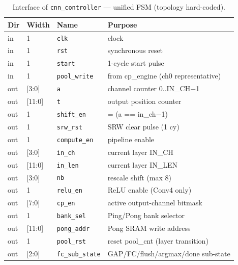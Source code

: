 
\begin{table}[t]
\centering
\caption{Interface of \texttt{cnn\_controller} — unified FSM (topology hard-coded).}
\label{tab:if-cnn-ctrl}
\small
\setlength{\tabcolsep}{4pt}
\renewcommand{\arraystretch}{1.1}
\begin{tabular}{@{}llll@{}}
\toprule
\textbf{Dir} & \textbf{Width} & \textbf{Name} & \textbf{Purpose} \\
\midrule
in  & 1      & \texttt{clk}            & clock \\
in  & 1      & \texttt{rst}            & synchronous reset \\
in  & 1      & \texttt{start}          & 1-cycle start pulse \\
in  & 1      & \texttt{pool\_write}    & from cp\_engine (ch0 representative) \\
out & [3:0]  & \texttt{a}              & channel counter 0..IN\_CH$-$1 \\
out & [11:0] & \texttt{t}              & output position counter \\
out & 1      & \texttt{shift\_en}      & = (a == in\_ch$-$1) \\
out & 1      & \texttt{srw\_rst}       & SRW clear pulse (1 cy) \\
out & 1      & \texttt{compute\_en}    & pipeline enable \\
out & [3:0]  & \texttt{in\_ch}         & current layer IN\_CH \\
out & [11:0] & \texttt{in\_len}        & current layer IN\_LEN \\
out & [3:0]  & \texttt{nb}             & rescale shift (max 8) \\
out & 1      & \texttt{relu\_en}       & ReLU enable (Conv4 only) \\
out & [7:0]  & \texttt{cp\_en}         & active output-channel bitmask \\
out & 1      & \texttt{bank\_sel}      & Ping/Pong bank selector \\
out & [11:0] & \texttt{pong\_addr}     & Pong SRAM write address \\
out & 1      & \texttt{pool\_rst}      & reset pool\_cnt (layer transition) \\
out & [2:0]  & \texttt{fc\_sub\_state} & GAP/FC/flush/argmax/done sub-state \\

\end{tabular}
\end{table}
